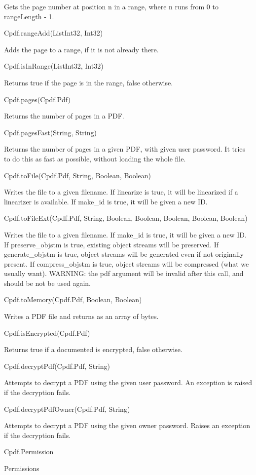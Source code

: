 Gets the page number at position n in a range, 
where n runs from 0 to rangeLength - 1.

Cpdf.rangeAdd(List{Int32}, Int32)

Adds the page to a range, if it is not already
there.

Cpdf.isInRange(List{Int32}, Int32)

Returns true if the page is in the range, 
false otherwise.

Cpdf.pages(Cpdf.Pdf)

Returns the number of pages in a PDF.

Cpdf.pagesFast(String, String)

Returns the number of pages in a given PDF, with given user password. It tries
to do this as fast as possible, without loading the whole file.

Cpdf.toFile(Cpdf.Pdf, String, Boolean, Boolean)

Writes the file to a given filename. If linearize is true, it will be
linearized if a linearizer is available. If make_id is true, it will be given a
new ID.

Cpdf.toFileExt(Cpdf.Pdf, String, Boolean, Boolean, Boolean, Boolean, Boolean)

Writes the file to a given filename. If make_id is true, it will be given a new
ID.  If preserve_objstm is true, existing object streams will be preserved. If
generate_objstm is true, object streams will be generated even if not
originally present. If compress_objstm is true, object streams will be
compressed (what we usually want). WARNING: the pdf argument will be invalid
after this call, and should be not be used again.

Cpdf.toMemory(Cpdf.Pdf, Boolean, Boolean)

Writes a PDF file and returns as an array of bytes.

Cpdf.isEncrypted(Cpdf.Pdf)

Returns true if a documented is encrypted, false otherwise.

Cpdf.decryptPdf(Cpdf.Pdf, String)

Attempts to decrypt a PDF using the given user password. An exception is raised
if the decryption fails.

Cpdf.decryptPdfOwner(Cpdf.Pdf, String)

Attempts to decrypt a PDF using the given owner password. Raises an exception
if the decryption fails.

Cpdf.Permission

Permissions

